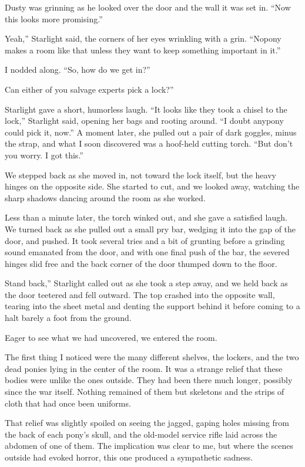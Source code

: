 Dusty was grinning as he looked over the door and the wall it was set in. “Now this looks more promising.”

\leavevmode{}Yeah,” Starlight said, the corners of her eyes wrinkling with a grin. “Nopony makes a room like that unless they want to keep something important in it.”

I nodded along. “So, how do we get in?”

\leavevmode{}Can either of you salvage experts pick a lock?”

Starlight gave a short, humorless laugh. “It looks like they took a chisel to the lock,” Starlight said, opening her bags and rooting around. “I doubt anypony could pick it, now.” A moment later, she pulled out a pair of dark goggles, minus the strap, and what I soon discovered was a hoof-held cutting torch. “But don’t you worry. I got this.”

We stepped back as she moved in, not toward the lock itself, but the heavy hinges on the opposite side. She started to cut, and we looked away, watching the sharp shadows dancing around the room as she worked.

Less than a minute later, the torch winked out, and she gave a satisfied laugh. We turned back as she pulled out a small pry bar, wedging it into the gap of the door, and pushed. It took several tries and a bit of grunting before a grinding sound emanated from the door, and with one final push of the bar, the severed hinges slid free and the back corner of the door thumped down to the floor.

\leavevmode{}Stand back,” Starlight called out as she took a step away, and we held back as the door teetered and fell outward. The top crashed into the opposite wall, tearing into the sheet metal and denting the support behind it before coming to a halt barely a foot from the ground.

Eager to see what we had uncovered, we entered the room.

The first thing I noticed were the many different shelves, the lockers, and the two dead ponies lying in the center of the room. It was a strange relief that these bodies were unlike the ones outside. They had been there much longer, possibly since the war itself. Nothing remained of them but skeletons and the strips of cloth that had once been uniforms.

That relief was slightly spoiled on seeing the jagged, gaping holes missing from the back of each pony’s skull, and the old-model service rifle laid across the abdomen of one of them. The implication was clear to me, but where the scenes outside had evoked horror, this one produced a sympathetic sadness.

